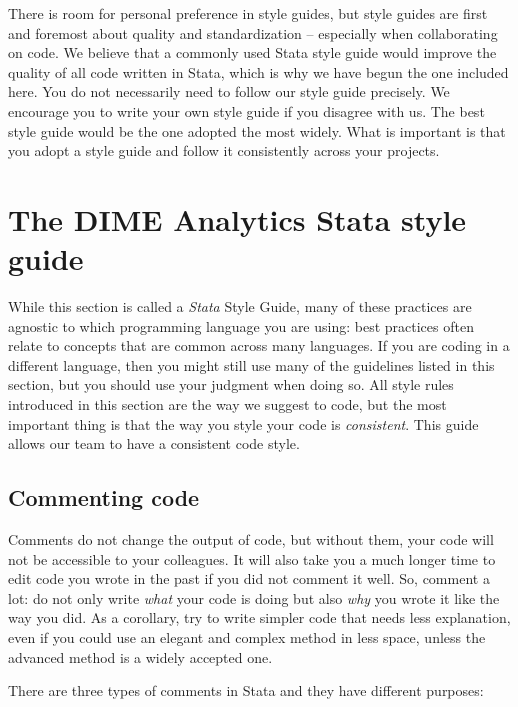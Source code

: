 There is room for personal preference in style guides,
but style guides are first and foremost about quality and standardization --
especially when collaborating on code.
We believe that a commonly used Stata style guide would improve the quality of all code written in Stata,
which is why we have begun the one included here.
You do not necessarily need to follow our style guide precisely.
We encourage you to write your own style guide if you disagree with us.
The best style guide would be the one adopted the most widely.
What is important is that you adopt a style guide and follow it consistently across your projects.

\newpage

\section{The DIME Analytics Stata style guide}

While this section is called a \textit{Stata} Style Guide,
many of these practices are agnostic to which programming language you are using:
best practices often relate to concepts that are common across many languages.
If you are coding in a different language,
then you might still use many of the guidelines listed in this section,
but you should use your judgment when doing so.
All style rules introduced in this section are the way we suggest to code,
but the most important thing is that the way you style your code is \textit{consistent}.
This guide allows our team to have a consistent code style.

\subsection{Commenting code}

Comments do not change the output of code, but without them,
your code will not be accessible to your colleagues.
It will also take you a much longer time to edit code you wrote in the past if you did not comment it well.
So, comment a lot: do not only write \textit{what} your code is doing
but also \textit{why} you wrote it like the way you did.
As a corollary, try to write simpler code that needs less explanation,
even if you could use an elegant and complex method in less space,
unless the advanced method is a widely accepted one.

There are three types of comments in Stata and they have different purposes:


